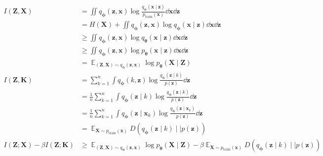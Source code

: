 \documentclass{article}
\begin{document}
\begin{align}
  \label{eq:ib3}
  I(\bm{Z}, \bm{X}) & = \iint q_{\bm{\phi}}(\bm{z}, \bm{x})\log\frac{q_{\bm{\phi}}(\bm{x}\mid\bm{z})}{p_\mathrm{train}(\bm{x})}\dd{\bm{x}}\dd{\bm{z}}\\
          & = H(\bm{X}) + \iint q_{\bm{\phi}}(\bm{z}, \bm{x})\log q_{\bm{\phi}}(\bm{x}\mid\bm{z})\dd{\bm{x}}\dd{\bm{z}}\\
          & \geqslant \iint q_{\bm{\phi}}(\bm{z}, \bm{x})\log q_{\bm{\theta}}(\bm{x}\mid\bm{z})\dd{\bm{x}}\dd{\bm{z}}\\
          & \geqslant \iint q_{\bm{\phi}}(\bm{z}, \bm{x})\log p_{\bm{\theta}}(\bm{x}\mid\bm{z})\dd{\bm{x}}\dd{\bm{z}}\\
          & = \mathop{\mathbb{E}}_{(\bm{Z}, \bm{X}) \sim q_{\bm{\phi}}(\bm{z}, \bm{x})}
          \log p_{\bm{\theta}}(\bm{X}\mid\bm{Z})\\
  I(\bm{Z}, \bm{K}) & = \sum_{k = 1}^n\int q_{\bm{\phi}}(k, \bm{z})\log\frac{q_{\bm{\phi}}(\bm{z}\mid k)}{p(\bm{z})}\dd{\bm{z}}\\
          & = \frac1n\sum_{k = 1}^n\int q_{\bm{\phi}}(\bm{z}\mid k)\log\frac{q_{\bm{\phi}}(\bm{z}\mid k)}{p(\bm{z})}\dd{\bm{z}}\\
          & = \frac1n\sum_{k = 1}^n\int q_{\bm{\phi}}(\bm{z}\mid\bm{x}_k)\log\frac{q_{\bm{\phi}}(\bm{z}\mid\bm{x}_k)}{p(\bm{z})}\dd{\bm{z}}\\
          & = \mathop{\mathbb{E}}_{\bm{X} \sim p_\mathrm{train}(\bm{x})} D(q_{\bm{\phi}}(\bm{z}\mid k)\mid\mid p(\bm{z}))\\
  I(\bm{Z}; \bm{X}) - \beta I(\bm{Z}; \bm{K}) & \geqslant
  \mathop{\mathbb{E}}_{(\bm{Z}, \bm{X}) \sim q_{\bm{\phi}}(\bm{z}, \bm{x})}
  \log p_{\bm{\theta}}(\bm{X}\mid\bm{Z}) -
  \beta\mathop{\mathbb{E}}_{\bm{X} \sim p_\mathrm{train}(\bm{x})} D(q_{\bm{\phi}}(\bm{z}\mid k)\mid\mid p(\bm{z}))
\end{align}



\end{document}
